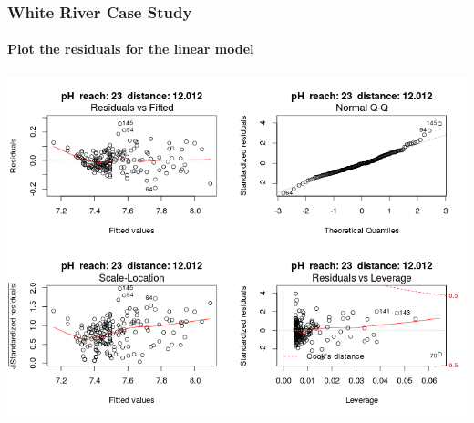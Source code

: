\documentclass[10pt]{beamer}
\newcommand{\iwsframe}[2]{
\begin{frame}[fragile]
\frametitle{#1}
\framesubtitle{#2}
}
\begin{document}
\iwsframe{White River Case Study}{Plot the residuals for the linear model}
\includegraphics[width=\textwidth]{whiteriverplot06.png}
\end{frame}
\end{document}
